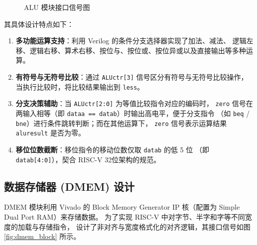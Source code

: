 \documentclass[12pt, a4paper]{ctexart}
\begin{document}
\begin{figure}[H]
    \centering
    \caption{ALU 模块接口信号图}
    \label{fig:alu_block}
\end{figure}

其具体设计特点如下：
\begin{enumerate}
    \item \textbf{多功能运算支持}：利用 Verilog 的条件分支选择器实现了加法、减法、
    逻辑左移、逻辑右移、算术右移、按位与、按位或、按位异或以及直接输出等多种运算。
    \item \textbf{有符号与无符号比较}：通过 \texttt{ALUctr[3]} 信号区分有符号与无符号比较操作，
    当执行比较时，将比较结果输出到 \texttt{less}。
    \item \textbf{分支决策辅助}：当 \texttt{ALUctr[2:0]} 为等值比较指令对应的编码时，
    \texttt{zero} 信号在两输入相等（即 \texttt{dataa == datab}）时输出高电平，便于分支指令
    （如 \texttt{beq} / \texttt{bne}）进行条件跳转判断；而在其他运算下，
    \texttt{zero} 信号表示运算结果 \texttt{aluresult} 是否为零。
    \item \textbf{移位位数截断}：移位指令的移动位数仅取 \texttt{datab} 的低 5 位
    （即 \texttt{datab[4:0]}），契合 RISC-V 32位架构的规范。
\end{enumerate}

\subsection{数据存储器 (DMEM) 设计}

DMEM 模块利用 Vivado 的 Block Memory Generator IP 核（配置为 Simple Dual Port RAM）来存储数据。
为了实现 RISC-V 中对字节、半字和字等不同宽度的加载与存储指令，
设计了非对齐与宽度格式化的对齐逻辑，其接口信号如图 \ref{fig:dmem_block} 所示。
\end{document}
